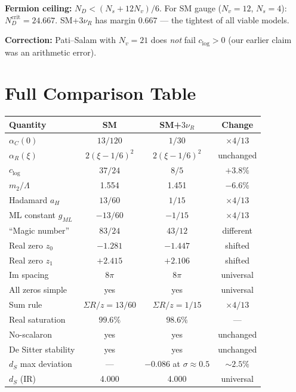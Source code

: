 \documentclass[11pt,a4paper]{article}
\begin{document}
\textbf{Fermion ceiling:} $N_D < (N_s + 12N_v)/6$.
For SM gauge ($N_v = 12$, $N_s = 4$): $N_D^{\mathrm{crit}} = 24.667$.
SM+$3\nu_R$ has margin $0.667$ --- the tightest of all viable models.

\textbf{Correction:} Pati--Salam with $N_v = 21$ does \emph{not} fail $c_{\log} > 0$
(our earlier claim was an arithmetic error).


\section{Full Comparison Table}

\begin{center}
\begin{tabular}{lccc}
\toprule
\textbf{Quantity} & \textbf{SM} & \textbf{SM+$3\nu_R$} & \textbf{Change} \\
\midrule
$\alpha_C(0)$ & $13/120$ & $1/30$ & $\times 4/13$ \\
$\alpha_R(\xi)$ & $2(\xi-1/6)^2$ & $2(\xi-1/6)^2$ & unchanged \\
$c_{\log}$ & $37/24$ & $8/5$ & $+3.8\%$ \\
$m_2/\Lambda$ & 1.554 & 1.451 & $-6.6\%$ \\
Hadamard $a_H$ & $13/60$ & $1/15$ & $\times 4/13$ \\
ML constant $g_{ML}$ & $-13/60$ & $-1/15$ & $\times 4/13$ \\
``Magic number'' & $83/24$ & $43/12$ & different \\
Real zero $z_0$ & $-1.281$ & $-1.447$ & shifted \\
Real zero $z_1$ & $+2.415$ & $+2.106$ & shifted \\
Im spacing & $8\pi$ & $8\pi$ & universal \\
All zeros simple & yes & yes & universal \\
Sum rule & $\Sigma R/z = 13/60$ & $\Sigma R/z = 1/15$ & $\times 4/13$ \\
Real saturation & $99.6\%$ & $98.6\%$ & --- \\
No-scalaron & yes & yes & unchanged \\
De Sitter stability & yes & yes & unchanged \\
$d_S$ max deviation & --- & $-0.086$ at $\sigma \approx 0.5$ & $\sim 2.5\%$ \\
$d_S$ (IR) & 4.000 & 4.000 & universal \\
\bottomrule
\end{tabular}
\end{center}
\end{document}
